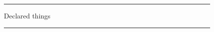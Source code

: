 \documentclass{article}
\begin{document}
\begin{figure}[h]\centering\rule{2cm}{1cm}\caption{Declared things}\end{figure}
\begin{figure}[h]\centering\rule{2cm}{1cm}\caption[]{}\end{figure}
\end{document}
